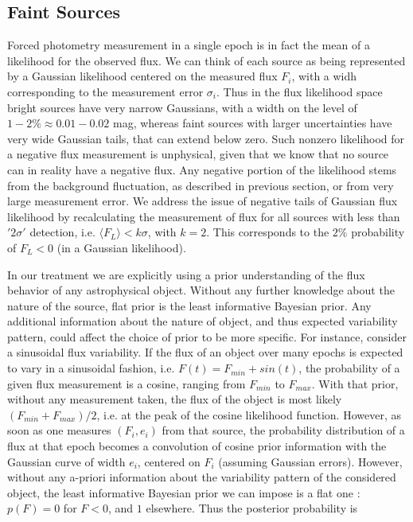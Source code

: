 \documentclass[fleqn,usenatbib]{mnras}  %
\begin{document}
\subsection{Faint Sources}
\label{sec:faint_sources}
Forced photometry measurement in a single epoch  is in fact the mean of a likelihood for the observed flux. We can think of each source as  being represented by a Gaussian likelihood centered on the measured flux $F_{i}$, with a widh corresponding to the measurement error $\sigma_{i}$. Thus in the flux likelihood space bright sources have very narrow Gaussians, with a width on the level of $1-2 \%  \approx 0.01-0.02$ mag, whereas faint sources with larger uncertainties have very wide Gaussian tails, that can extend  below zero.  Such nonzero likelihood for a negative flux measurement is unphysical, given that we know that no source can in  reality have a negative flux. Any negative portion of the likelihood stems from the background fluctuation, as described in previous section, or from very large measurement error. We address the issue of negative tails of Gaussian flux likelihood by recalculating the measurement of flux for all sources  with less than $'2\sigma'$ detection, i.e. $ \langle F_{L} \rangle  < k \sigma$, with $k=2$. This corresponds to the $2\%$ probability of $F_{L} < 0$  (in a  Gaussian likelihood).

In our treatment we are explicitly using a prior understanding of the flux behavior of any astrophysical object.  Without any further knowledge about the nature of the source, flat prior is the least informative Bayesian prior. Any additional information about the nature of object, and thus expected variability pattern,  could affect the choice of prior to be more specific. For instance,  consider a sinusoidal flux variability. If the flux of an object over many epochs is expected to vary in a sinusoidal fashion, i.e. $F(t) = F_{min}+ sin(t)$, the probability of a given  flux measurement is a cosine, ranging from $F_{min}$ to $F_{max}$. With that prior, without any measurement taken, the flux of the object is most likely  $(F_{min} + F_{max}) /  2$, i.e. at the peak of the cosine likelihood function. However, as soon as one measures $(F_{i},e_{i})$ from that source, the probability distribution of a flux at that epoch becomes a convolution of cosine prior information with the Gaussian curve of width $e_{i}$, centered on $F_{i}$ (assuming Gaussian errors). However, without any a-priori information about the variability pattern of the considered object, the least informative Bayesian prior we can impose is a flat one : $p(F)=0 $ for $F<0$, and $1$ elsewhere. Thus the posterior probability is 
\end{document}
